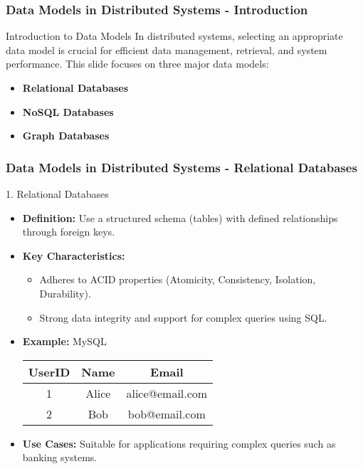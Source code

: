 \documentclass[aspectratio=169]{beamer}
\begin{document}
\begin{frame}[fragile]
    \frametitle{Data Models in Distributed Systems - Introduction}
    \begin{block}{Introduction to Data Models}
        In distributed systems, selecting an appropriate data model is crucial for efficient data management, retrieval, and system performance. This slide focuses on three major data models:
    \end{block}
    \begin{itemize}
        \item \textbf{Relational Databases}
        \item \textbf{NoSQL Databases}
        \item \textbf{Graph Databases}
    \end{itemize}
\end{frame}

\begin{frame}[fragile]
    \frametitle{Data Models in Distributed Systems - Relational Databases}
    \begin{block}{1. Relational Databases}
        \begin{itemize}
            \item \textbf{Definition:} Use a structured schema (tables) with defined relationships through foreign keys.
            \item \textbf{Key Characteristics:}
                \begin{itemize}
                    \item Adheres to ACID properties (Atomicity, Consistency, Isolation, Durability).
                    \item Strong data integrity and support for complex queries using SQL.
                \end{itemize}
            \item \textbf{Example:} MySQL
                \begin{table}[]
                    \centering
                    \begin{tabular}{|c|c|c|}
                        \hline
                        UserID & Name  & Email            \\ \hline
                        1      & Alice & alice@email.com   \\ \hline
                        2      & Bob   & bob@email.com     \\ \hline
                    \end{tabular}
                \end{table}
            \item \textbf{Use Cases:} Suitable for applications requiring complex queries such as banking systems.
        \end{itemize}
    \end{block}
\end{frame}
\end{document}
